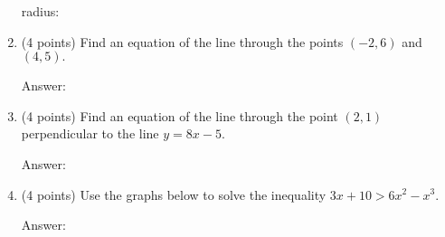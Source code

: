 \documentclass[11pt]{article}
\begin{document}
\begin{enumerate}
\begin{flushright}{radius: \underline{\hspace{2in}}}\end{flushright}

\item (4 points) Find an equation of the line through the points $(-2,6)$ and $(4,5).$

\begin{flushright}{Answer: \underline{\hspace{2in}}}\end{flushright}
\vfill

\item (4 points) Find an equation of the line through the point $(2,1)$ perpendicular to the line $y=8x-5.$

\begin{flushright}{Answer: \underline{\hspace{2in}}}\end{flushright}
\vfill

\item (4 points) Use the graphs below to solve the inequality $3x+10 > 6x^2-x^3.$\\
\begin{flushright}{Answer: \underline{\hspace{2in}}}\end{flushright}

\end{enumerate}
\end{document}

